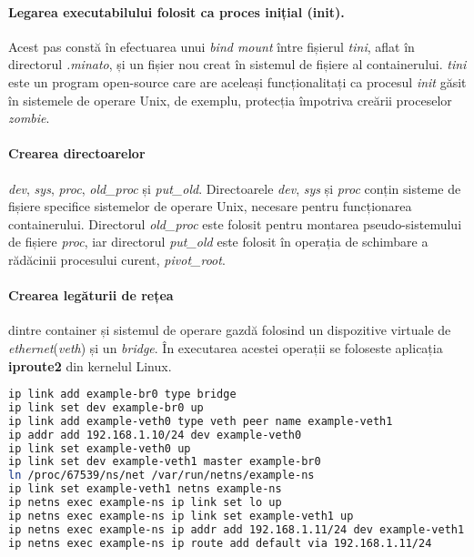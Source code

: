             \paragraph{Legarea executabilului folosit ca proces inițial (init).} Acest pas constă în efectuarea unui \textit{bind mount} între fișierul \textit{tini}, aflat în directorul \textit{.minato}, și un fișier nou creat în sistemul de fișiere al containerului. \textit{tini} este un program open-source care are aceleași funcționalitați ca procesul \textit{init} găsit în sistemele de operare Unix, de exemplu, protecția împotriva creării proceselor \textit{zombie}.
            \paragraph{Crearea directoarelor} \textit{dev}, \textit{sys}, \textit{proc}, \textit{old\_proc} și \textit{put\_old}. Directoarele \textit{dev}, \textit{sys} și \textit{proc} conțin sisteme de fișiere specifice sistemelor de operare Unix, necesare pentru funcționarea containerului. Directorul \textit{old\_proc} este folosit pentru montarea pseudo-sistemului de fișiere \textit{proc}, iar directorul \textit{put\_old} este folosit în operația de schimbare a rădăcinii procesului curent, \textit{pivot\_root}.
            \paragraph{Crearea legăturii de rețea} dintre container și sistemul de operare gazdă folosind un dispozitive virtuale de \textit{ethernet}(\textit{veth}) și un \textit{bridge}. În executarea acestei operații se foloseste aplicația \textbf{iproute2} din kernelul Linux.
            \begin{lstlisting}[language=bash, style=boxed, caption={Comenzile utilizate pentru crearea legăturii de rețea},captionpos=b]
ip link add example-br0 type bridge
ip link set dev example-br0 up
ip link add example-veth0 type veth peer name example-veth1
ip addr add 192.168.1.10/24 dev example-veth0
ip link set example-veth0 up
ip link set dev example-veth1 master example-br0
ln /proc/67539/ns/net /var/run/netns/example-ns
ip link set example-veth1 netns example-ns
ip netns exec example-ns ip link set lo up
ip netns exec example-ns ip link set example-veth1 up
ip netns exec example-ns ip addr add 192.168.1.11/24 dev example-veth1
ip netns exec example-ns ip route add default via 192.168.1.11/24 \end{lstlisting}
                \label{fig:cod_net}
